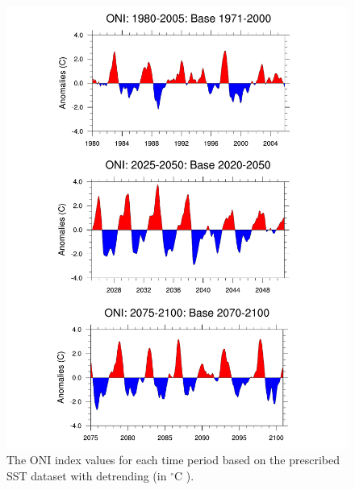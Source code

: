 \documentclass{ametsoc}
\begin{document}
\begin{figure}
\begin{center}
\includegraphics[width=6in]{indices_oni.pdf}
\caption{The ONI index values for each time period based on the prescribed SST dataset with detrending (in $^\circ$C ).}
\end{center}
\label{fig:S2}
\end{figure}


\end{document}
